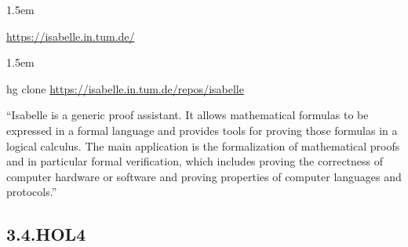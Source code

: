 \documentclass[12pt,twoside]{article}
\begin{document}
\begin{mddefinitions}%


\begin{mdbmarginx}{}{}{}{1.5em}%
\begin{mddefdata}%
\href{https://isabelle.in.tum.de/}{{\ttfamily https://\hspace{0pt}isabelle.\hspace{0pt}in.\hspace{0pt}tum.\hspace{0pt}de/\hspace{0pt}}}
\end{mddefdata}%
\end{mdbmarginx}%


\begin{mdbmarginx}{}{}{}{1.5em}%
\begin{mddefdata}%
hg clone \href{https://isabelle.in.tum.de/repos/isabelle}{{\ttfamily https://\hspace{0pt}isabelle.\hspace{0pt}in.\hspace{0pt}tum.\hspace{0pt}de/\hspace{0pt}repos/\hspace{0pt}isabelle}}%
\end{mddefdata}%
\end{mdbmarginx}%
\end{mddefinitions}%

\noindent{}\textquotedblleft{}Isabelle is a generic proof assistant. It allows mathematical
formulas to be expressed in a formal language and provides tools for
proving those formulas in a logical calculus. The main application is
the formalization of mathematical proofs and in particular formal
verification, which includes proving the correctness of computer
hardware or software and proving properties of computer languages and
protocols.\textquotedblright{}%

\subsection{3.4.\hspace*{0.5em}HOL4}\label{sec-hol4}%
\end{document}

